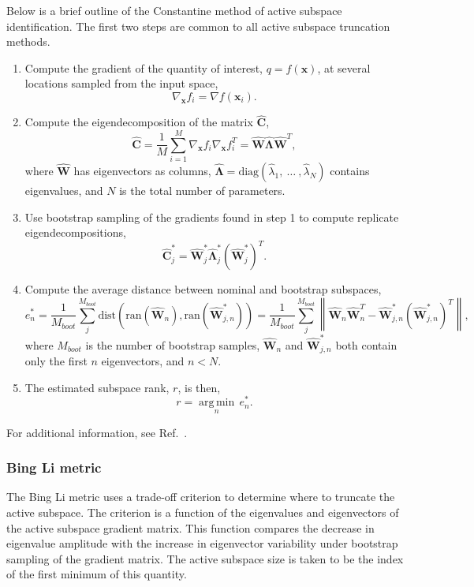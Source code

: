 Below is a brief outline of the Constantine method of active subspace 
identification. The first two steps are common to all active subspace 
truncation methods.
\begin{enumerate}
\item Compute the gradient of the quantity of interest, $q = f(\mathbf{x})$,
    at several locations sampled from the input space,
    $$\nabla_{\mathbf{x}} f_i = \nabla f(\mathbf{x}_i).$$

\item Compute the eigendecomposition of the matrix $\hat{\mathbf{C}}$,
    $$\hat{\mathbf{C}} = \frac{1}{M}\sum_{i=1}^{M}\nabla_{\mathbf{x}} f_i\nabla_{\mathbf{x}} f_i^T = \hat{\mathbf{W}}\hat{\mathbf{\Lambda}}\hat{\mathbf{W}}^T,$$
    where $\hat{\mathbf{W}}$ has eigenvectors as columns, 
    $\hat{\mathbf{\Lambda}} = \text{diag}(\hat{\lambda}_1,\:\ldots\:,\hat{\lambda}_N)$
    contains eigenvalues, and $N$ is the total number of parameters.

\item Use bootstrap sampling of the gradients found in step 1 to compute replicate
    eigendecompositions,
    $$\hat{\mathbf{C}}_j^* = \hat{\mathbf{W}}_j^*\hat{\mathbf{\Lambda}}_j^*\left(\hat{\mathbf{W}}_j^*\right)^T.$$

\item Compute the average distance between nominal and bootstrap subspaces,
    $$e^*_n = \frac{1}{M_{boot}}\sum_j^{M_{boot}} \text{dist}(\text{ran}(\hat{\mathbf{W}}_n), \text{ran}(\hat{\mathbf{W}}_{j,n}^*)) = \frac{1}{M_{boot}}\sum_j^{M_{boot}} \left\| \hat{\mathbf{W}}_n\hat{\mathbf{W}}_n^T - \hat{\mathbf{W}}_{j,n}^*\left(\hat{\mathbf{W}}_{j,n}^*\right)^T\right\|,$$
    where $M_{boot}$ is the number of bootstrap samples, 
    $\hat{\mathbf{W}}_n$ and $\hat{\mathbf{W}}_{j,n}^*$ both contain 
    only the first $n$ eigenvectors, and $n < N$.

\item The estimated subspace rank, $r$, is then,
    $$r = \operatorname*{arg\,min}_n \, e^*_n.$$
\end{enumerate}

For additional information, see Ref.~\cite{constantine2015active}.

\subsubsection{Bing Li metric}\label{SubSec:bingli}
The Bing Li metric uses a trade-off criterion to determine where to truncate the active subspace.
The criterion is a function of the eigenvalues
and eigenvectors of the active subspace gradient matrix. This function compares 
the decrease in eigenvalue amplitude with the increase in eigenvector variability
under bootstrap sampling of the gradient matrix. The active subspace size is taken to 
be the index of the first minimum of this quantity.

